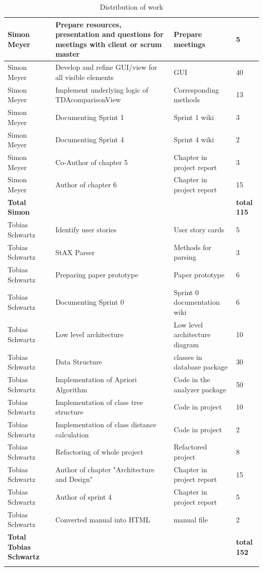 \begin{longtable}{|p{}||p{}|p{}|p{}|}
    \hline
    Simon Meyer & Prepare resources, presentation and questions for meetings with client or scrum master & Prepare meetings & 5 \\ 
    \hline
    Simon Meyer & Develop and refine GUI/view for all visible elements & GUI & 40 \\ 
    \hline
    Simon Meyer & Implement underlying logic of TDAcomparisonView & Corresponding methods & 13 \\ 
    \hline
    Simon Meyer & Documenting Sprint 1 & Sprint 1 wiki & 3 \\ 
    \hline 
    Simon Meyer & Documenting Sprint 4 & Sprint 4 wiki & 2 \\ 
    \hline 
    Simon Meyer & Co-Author of chapter 5 & Chapter in project report & 3 \\ 
    \hline
    Simon Meyer & Author of chapter 6 & Chapter in project report & 15 \\ 
    \hline
    \hline 
    \textbf{Total \newline Simon} & & & \textbf{total 115}   \\
    \hline
    \hline
    Tobias Schwartz & Identify user stories & User story cards & 5 \\
    \hline
    Tobias Schwartz & StAX Parser & Methods for parsing & 3 \\ 
    \hline
	Tobias Schwartz & Preparing paper prototype & Paper prototype & 6 \\ 
    \hline
    Tobias Schwartz & Documenting Sprint 0 & Sprint 0 documentation wiki & 6 \\
    \hline
    Tobias Schwartz & Low level architecture & Low level architecture diagram & 10 \\ 
    \hline
    Tobias Schwartz & Data Structure & classes in database package & 30 \\
    \hline
    Tobias Schwartz & Implementation of Apriori Algorithm & Code in the analyzer package & 50 \\ 
    \hline
    Tobias Schwartz & Implementation of class tree structure & Code in project & 10 \\
    \hline
    Tobias Schwartz & Implementation of class distance calculation & Code in project & 2 \\
    \hline
    Tobias Schwartz & Refactoring of whole project & Refactored project & 8 \\
    \hline
    Tobias Schwartz & Author of chapter "Architecture and Design" & Chapter in project report & 15 \\ 
    \hline
    Tobias Schwartz & Author of sprint 4 & Chapter in project report & 5 \\ 
    \hline
    Tobias Schwartz & Converted manual into HTML & manual file & 2 \\ 
    \hline
    \hline 
    \textbf{Total \newline Tobias Schwartz} & & & \textbf{total 152}   \\
    \hline
  \caption{Distribution of work}
\end{longtable}


